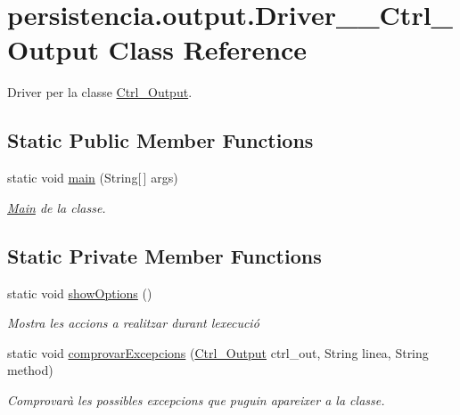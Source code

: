 \hypertarget{classpersistencia_1_1output_1_1Driver____Ctrl__Output}{}\section{persistencia.\+output.\+Driver\+\_\+\+\_\+\+Ctrl\+\_\+\+Output Class Reference}
\label{classpersistencia_1_1output_1_1Driver____Ctrl__Output}


Driver per la classe \hyperlink{classpersistencia_1_1output_1_1Ctrl__Output}{Ctrl\+\_\+\+Output}.  


\subsection*{Static Public Member Functions}
\begin{DoxyCompactItemize}
\item 
static void \hyperlink{classpersistencia_1_1output_1_1Driver____Ctrl__Output_ab5a20df1417ca8ac83a4c754c284599c}{main} (String\mbox{[}$\,$\mbox{]} args)
\begin{DoxyCompactList}\small\item\em \hyperlink{classMain}{Main} de la classe. \end{DoxyCompactList}\end{DoxyCompactItemize}
\subsection*{Static Private Member Functions}
\begin{DoxyCompactItemize}
\item 
static void \hyperlink{classpersistencia_1_1output_1_1Driver____Ctrl__Output_aceadcc132060c8491487c7d20a382c5b}{show\+Options} ()
\begin{DoxyCompactList}\small\item\em Mostra les accions a realitzar durant l\textquotesingle{}execució \end{DoxyCompactList}\item 
static void \hyperlink{classpersistencia_1_1output_1_1Driver____Ctrl__Output_a19885299457cf4049efde8b78a0f7627}{comprovar\+Excepcions} (\hyperlink{classpersistencia_1_1output_1_1Ctrl__Output}{Ctrl\+\_\+\+Output} ctrl\+\_\+out, String linea, String method)
\begin{DoxyCompactList}\small\item\em Comprovarà les possibles excepcions que puguin apareixer a la classe. \end{DoxyCompactList}\end{DoxyCompactItemize}


